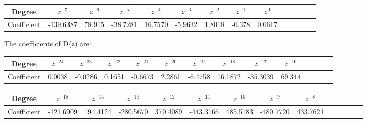 \documentclass{article}
\begin{document}
\begin{table}[H]
		\begin{center}
		\begin{tabular}{|c|c|c|c|c|c|c|c|c|c|c|c|c|c|}
			\hline
			Degree &  $z^{-7}$ & $z^{-6}$  & $z^{-5}$ & $z^{-4}$ & $z^{-3}$ & $z^{-2}$ & $z^{-1}$ & $z^0$ \\
			
			\hline
                Coefficient & -139.6387 & 78.915 & -38.7281 & 16.7570 & -5.9632 & 1.8018 & -0.378 & 0.0617 \\
                \hline
            
		\end{tabular}
		\end{center}
\end{table}

The coefficients of D(z) are:

\begin{table}[H]
		\begin{center}
		\begin{tabular}{|c|c|c|c|c|c|c|c|c|c|c|c|c|c|}
			\hline
			Degree & $z^{-24}$ & $z^{-23}$ & $z^{-22}$  & $z^{-21}$ & $z^{-20}$ & $z^{-19}$ & $z^{-18}$ & $z^{-17}$ & $z^{-16}$\\
			
			\hline
                Coefficient & 0.0038 & -0.0286 & 0.1651  & -0.6673 & 2.2861 & -6.4758 & 16.1872 & -35.3039 & 69.344 \\
                \hline
            
		\end{tabular}
		\end{center}
\end{table}

\begin{table}[H]
		\begin{center}
		\begin{tabular}{|c|c|c|c|c|c|c|c|c|c|c|c|c|c|}
			\hline
			Degree &  $z^{-15}$ & $z^{-14}$  & $z^{-13}$ & $z^{-12}$ & $z^{-11}$ & $z^{-10}$ & $z^{-9}$ & $z^{-8}$ \\
			
			\hline
                Coefficient  & -121.6909 & 194.4124 & -280.5670 & 370.4089 & -443.3166 & 485.5183 & -480.7720 & 433.7621 \\
                \hline
            
		\end{tabular}
		\end{center}
\end{table}
\end{document}
